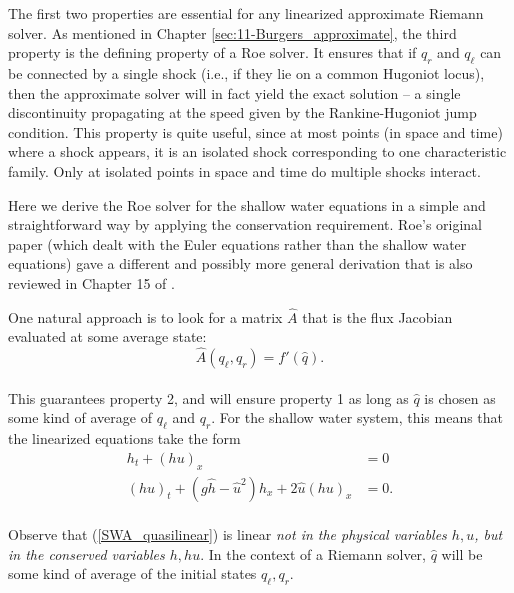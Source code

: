 \documentclass{SIAMbook2016}
\begin{document}
The first two properties are essential for any linearized approximate
Riemann solver. As mentioned in
Chapter \ref{sec:11-Burgers_approximate}, the third property is the
defining property of a Roe solver. It ensures that if \(q_r\) and
\(q_\ell\) can be connected by a single shock (i.e., if they lie on a
common Hugoniot locus), then the approximate solver will in fact yield
the exact solution -- a single discontinuity propagating at the speed
given by the Rankine-Hugoniot jump condition. This property is quite
useful, since at most points (in space and time) where a shock appears,
it is an isolated shock corresponding to one characteristic family. Only
at isolated points in space and time do multiple shocks interact.

Here we derive the Roe solver for the shallow water equations in a
simple and straightforward way by applying the conservation requirement.
Roe's original paper \cite{roe1981approximate} (which dealt with the
Euler equations rather than the shallow water equations) gave a
different and possibly more general derivation that is also reviewed in
Chapter 15 of \cite{fvmhp}.

One natural approach is to look for a matrix \(\hat{A}\) that is the
flux Jacobian evaluated at some average state:\\
\[\hat{A}(q_\ell,q_r) = f'(\hat{q}).\]\\
This guarantees property 2, and will ensure property 1 as long as
\(\hat{q}\) is chosen as some kind of average of \(q_\ell\) and \(q_r\).
For the shallow water system, this means that the linearized equations
take the form\\
\begin{align} \label{SWA_quasilinear}
h_t + (hu)_x & = 0 \\
(hu)_t + (g\hat{h}-\hat{u}^2)h_x + 2\hat{u}(hu)_x & = 0. \nonumber
\end{align}\\
Observe that (\ref{SWA_quasilinear}) is linear \emph{not in the physical
variables \(h, u\), but in the conserved variables \(h, hu\)}. In the
context of a Riemann solver, \(\hat{q}\) will be some kind of average of
the initial states \(q_\ell, q_r\).
\end{document}
